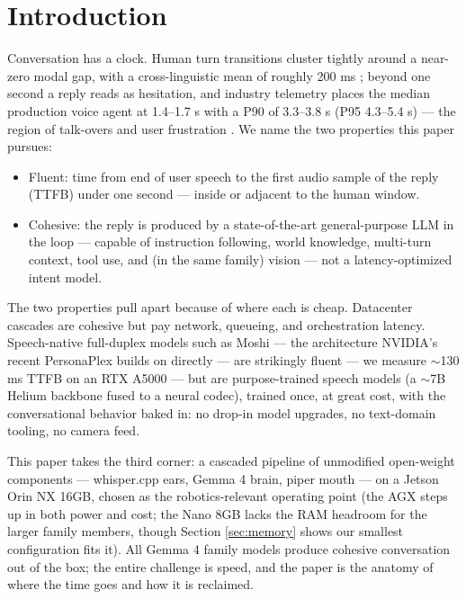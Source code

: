 \documentclass{article}
\begin{document}
\section{Introduction}

Conversation has a clock. Human turn transitions cluster tightly around a near-zero modal gap, with a cross-linguistic mean of roughly 200 ms \citep{stivers2009turntaking}; beyond one second a reply reads as hesitation, and industry telemetry places the median production voice agent at 1.4--1.7 s with a P90 of 3.3--3.8 s (P95 4.3--5.4 s) --- the region of talk-overs and user frustration \citep{sharma2026latency,hamming2026metrics}. We name the two properties this paper pursues:

\begin{itemize}
	\item Fluent: time from end of user speech to the first audio sample of the reply (TTFB) under one second --- inside or adjacent to the human window.
	\item Cohesive: the reply is produced by a state-of-the-art general-purpose LLM in the loop --- capable of instruction following, world knowledge, multi-turn context, tool use, and (in the same family) vision --- not a latency-optimized intent model.
\end{itemize}

The two properties pull apart because of where each is cheap. Datacenter cascades are cohesive but pay network, queueing, and orchestration latency. Speech-native full-duplex models such as Moshi \citep{defossez2024moshi} --- the architecture NVIDIA's recent PersonaPlex builds on directly \citep{roy2026personaplex} --- are strikingly fluent --- we measure $\sim$130 ms TTFB on an RTX A5000 --- but are purpose-trained speech models (a $\sim$7B Helium backbone fused to a neural codec), trained once, at great cost, with the conversational behavior baked in: no drop-in model upgrades, no text-domain tooling, no camera feed.

This paper takes the third corner: a cascaded pipeline of unmodified open-weight components --- whisper.cpp ears, Gemma 4 brain, piper mouth --- on a Jetson Orin NX 16GB, chosen as the robotics-relevant operating point (the AGX steps up in both power and cost; the Nano 8GB lacks the RAM headroom for the larger family members, though Section \ref{sec:memory} shows our smallest configuration fits it). All Gemma 4 family models produce cohesive conversation out of the box; the entire challenge is speed, and the paper is the anatomy of where the time goes and how it is reclaimed.
\end{document}
